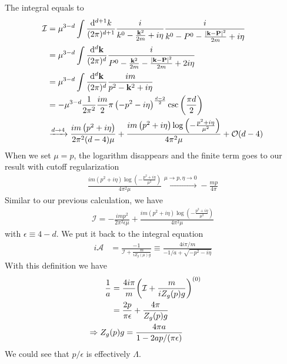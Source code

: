 \documentclass{article}
\newcommand{\calA}{\mathcal{A}}
\newcommand{\mmd}[2][d]{\frac{\dd^{#1}{#2}}{(2\pi)^{#1}}}
\begin{document}
The integral equals to
\begin{align}
	\mathcal{I} & =\mu^{3-d}\int\mmd[d+1]{k}\frac{i}{k^0-\frac{\vb{k}^2}{2m}+i\eta}\frac{i}{k^0-P^0-\frac{\abs{\vb{k-P}}^2}{2m}+i\eta}                                      \\
	            & =\mu^{3-d}\int\mmd[d]{\vb{k}}\frac{i}{P^0-\frac{\vb{k}^2}{2m}-\frac{\abs{\vb{k-P}}^2}{2m}+2i\eta}                                                             \\
	            & =\mu^{3-d}\int\mmd[d]{\vb{k}}\frac{im}{p^2-\vb{k}^2+i\eta}                                                                                                    \\
	            & =-\mu^{3-d}\frac{1}{2 \pi ^2}\frac{im}{2} \pi  \left(-p^2-i \eta \right)^{\frac{d-2}{2}} \csc \left(\frac{\pi  d}{2}\right)                                     \\
	            & \xrightarrow{d\to 4}\frac{i m \left(p^2+i \eta \right)}{2 \pi ^2 (d-4) \mu }+\frac{i m \left(p^2+i \eta \right) \log \left(-\frac{p^2+i \eta }{\mu ^2}\right)}{4 \pi ^2 \mu }+\mathcal{O}(d-4)
\end{align}
When we set $\mu=p$, the logarithm disappears and the finite term goes to our result with cutoff regularization
\begin{align}
	\frac{i m \left(p^2+i \eta \right) \log \left(-\frac{p^2+i \eta }{\mu ^2}\right)}{4 \pi ^2 \mu }\xrightarrow{\mu\to p,\eta\to0}-\frac{m p}{4 \pi}
\end{align}
Similar to our previous calculation, we have
\begin{align}
    \mathcal{I}=-\frac{i m p^2}{2 \pi ^2 \epsilon \mu }+\frac{i m \left(p^2+i \eta \right) \log \left(-\frac{p^2+i \eta }{\mu ^2}\right)}{4 \pi ^2 \mu }
\end{align}
with $\epsilon\equiv4-d$. 
We put it back to the integral equation
\begin{align}
    i\calA & =\frac{-1}{\mathcal{I}+\frac{m}{iZ_g(\mu)g}}\equiv\frac{4 i \pi/m  }{-1/a+ \sqrt{-p^2-i\eta}}
\end{align}
With this definition we have
\begin{align}
    \frac{1}{a} & =\frac{4i\pi}{m}\pqty{\mathcal{I}+\frac{m}{iZ_g(p)g}}^{(0)}             \\
                & =\frac{2 p}{\pi  \epsilon }+\frac{4 \pi }{Z_g(p)g}                        \\
                & \hspace{-0.4in}\Rightarrow Z_g(p)g=\frac{4 \pi  a}{1 -2 a p/(\pi\epsilon)}
\end{align}
We could see that $p/\epsilon$ is effectively $\Lambda$. 
\end{document}
